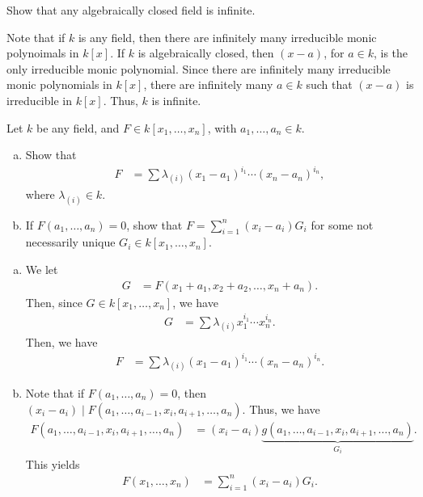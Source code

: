 \documentclass[10pt]{mypackage}
\begin{document}
\begin{exercise}[Exercise 1.6]
Show that any algebraically closed field is infinite.
\end{exercise}
\begin{solution}
  Note that if $k$ is any field, then there are infinitely many irreducible monic polynoimals in $k\left[x\right]$. If $k$ is algebraically closed, then $\left(x-a\right)$, for $a\in k$, is the only irreducible monic polynomial. Since there are infinitely many irreducible monic polynomials in $k\left[x\right]$, there are infinitely many $a\in k$ such that $\left(x-a\right)$ is irreducible in $k\left[x\right]$. Thus, $k$ is infinite.
\end{solution}

\begin{exercise}[Exercise 1.7]
Let $k$ be any field, and $F\in k\left[x_1,\dots,x_n\right]$, with $a_1,\dots,a_n\in k$.
\begin{enumerate}[(a)]
  \item Show that
    \begin{align*}
      F &= \sum\lambda_{(i)}\left(x_1-a_1\right)^{i_1}\cdots \left(x_n-a_n\right)^{i_n},
    \end{align*}
    where $\lambda_{(i)}\in k$.
  \item If $F\left(a_1,\dots,a_n\right) = 0$, show that $F = \sum_{i=1}^{n}\left(x_i - a_i\right)G_i$ for some not necessarily unique $G_i\in k\left[x_1,\dots,x_n\right]$.
\end{enumerate}
\end{exercise}
\begin{solution}\hfill
  \begin{enumerate}[(a)]
    \item We let
      \begin{align*}
        G &= F\left(x_1+a_1,x_2 + a_2,\dots,x_n + a_n\right).
      \end{align*}
      Then, since $G\in k\left[x_1,\dots,x_n\right]$, we have
      \begin{align*}
        G &= \sum \lambda_{(i)}x_1^{i_1}\cdots x_n^{i_n}.
      \end{align*}
      Then, we have
      \begin{align*}
        F &= \sum \lambda_{(i)}\left(x_1 - a_1\right)^{i_1} \cdots \left(x_n-a_n\right)^{i_n}.
      \end{align*}
    \item Note that if $F\left(a_1,\dots,a_n\right) = 0$, then $\left(x_i - a_i\right) \mid F\left(a_1,\dots,a_{i-1},x_i,a_{i+1},\dots,a_n\right)$. Thus, we have
      \begin{align*}
        F\left(a_1,\dots,a_{i-1},x_i,a_{i+1},\dots,a_n\right) &= \left(x_i - a_i\right)\underbrace{g\left(a_1,\dots,a_{i-1},x_i,a_{i+1},\dots,a_n\right)}_{G_i}.
      \end{align*}
      This yields
      \begin{align*}
        F\left(x_1,\dots,x_n\right) &= \sum_{i=1}^{n}\left(x_i - a_i\right)G_i.
      \end{align*}
  \end{enumerate}
\end{solution}
\end{document}
